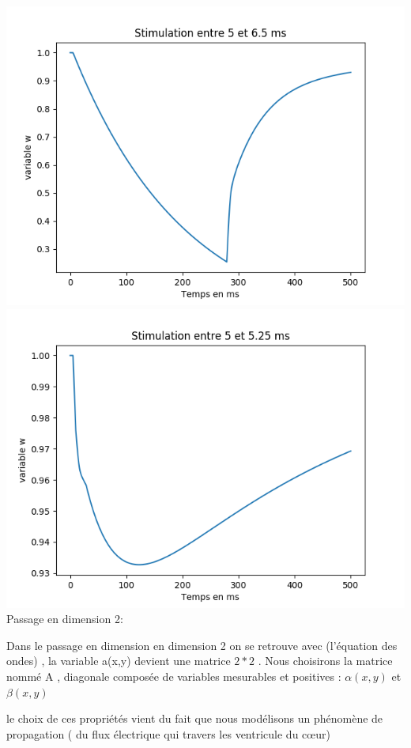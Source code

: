 \documentclass[a4paper,12pt,twoside]{report}
\begin{document}
\includegraphics[scale=0.5]{./w(t).png}\\
\includegraphics[scale=0.5]{./w(t)_2.png}\\





Passage en dimension 2:

Dans le passage en dimension en dimension 2 on se retrouve avec (l'équation des ondes) , la variable a(x,y) devient une matrice $2*2$ .
Nous choisirons la matrice nommé A , diagonale composée de variables mesurables et positives :
 $\alpha(x,y)$ et $\beta(x,y)$
 
 le choix de ces  propriétés vient du fait que nous modélisons un phénomène de propagation ( du flux électrique qui travers les ventricule du cœur)
\end{document}
